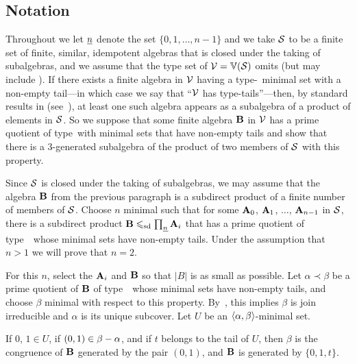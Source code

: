 \subsection{Notation}
Throughout we let $\underline{n}$ denote the set $\{0,1,\dots, n-1\}$ and 
we take $\mathcal{S}$ to be a finite set of finite,
similar, idempotent algebras that is closed under the taking of 
subalgebras, and we assume that the type set of
$\mathcal{V} = \operatorname{\mathbb{V}}(\mathcal{S})$ omits \utyp (but may include \styp).
If there exists a finite algebra in $\mathcal{V}$ having a type-\atyp\ minimal 
set with a non-empty tail---in which case we say that 
``$\mathcal{V}$ has type-\atyp tails''---then, 
by standard results in \tct (see~\cite{HM:1988}),
at least one such algebra appears as a subalgebra of a product of 
elements in $\mathcal{S}$.
So we suppose that some finite algebra
$\mathbf{B}$ in $\mathcal{V}$ has a prime quotient of type~\atyp with 
minimal sets that have 
non-empty tails and show that there is a 3-generated 
subalgebra of the
product of two members of $\mathcal{S}$ with this property.

Since $\mathcal{S}$ is closed under the taking of subalgebras,
we may assume that the algebra $\mathbf{B}$ from the previous paragraph is a subdirect
product of a finite number of members of $\mathcal{S}$. Choose $n$ minimal such that for
some $\mathbf{A}_0$, $\mathbf{A}_1$, $\dots$, $\mathbf{A}_{n-1}$ in $\mathcal{S}$, there is a subdirect
product $\mathbf{B} \leqslant_{\mathrm{sd}} \prod_{\underline{n}} \mathbf{A}_i$
that has a prime quotient of type~\atyp\ whose minimal sets have
non-empty tails.
Under the assumption that $n > 1$ we will prove that $n = 2$.

For this $n$, select the $\mathbf{A}_i$ and $\mathbf{B}$ so that $|B|$ is as small as possible.
Let $\alpha \prec \beta$ be a prime quotient of $\mathbf{B}$ 
of type~\atyp\ whose minimal sets have
non-empty tails, and choose $\beta$ minimal with respect to this property.
By~\cite[Lemma 6.2]{HM:1988}, this implies $\beta$ is join 
irreducible and $\alpha$ is its unique subcover.
Let $U$ be an $\langle\alpha, \beta\rangle$-minimal set. 


\begin{lemma}
\label{lem:fv_3-1}
If\/ $0$, $1 \in U$, if $(0,1) \in \beta - \alpha$, and if
$t$ belongs to the tail of $U$, then $\beta$ is the congruence of $\mathbf{B}$
generated by the pair $(0,1)$, and $\mathbf{B}$ is generated by $\{0, 1, t\}$.
\end{lemma}

